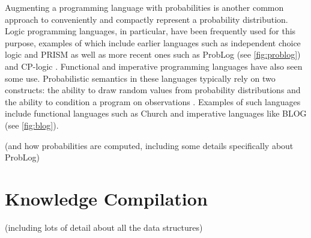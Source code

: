 Augmenting a programming language with probabilities is another common approach
to conveniently and compactly represent a probability distribution. Logic
programming languages, in particular, have been frequently used for this
purpose, examples of which include earlier languages such as independent choice
logic \citep{DBLP:journals/ai/Poole97} and PRISM \citep{DBLP:conf/ijcai/SatoK97}
as well as more recent ones such as ProbLog \citep{DBLP:conf/ijcai/RaedtKT07}
(see \cref{fig:problog}) and CP-logic \citep{DBLP:journals/tplp/VennekensDB09}.
Functional and imperative programming languages have also seen some use.
Probabilistic semantics in these languages typically rely on two constructs: the
ability to draw random values from probability distributions and the ability to
condition a program on observations \citep{DBLP:conf/icse/GordonHNR14}. Examples
of such languages include functional languages such as Church
\citep{DBLP:conf/uai/GoodmanMRBT08} and imperative languages like BLOG
\citep{DBLP:conf/ijcai/MilchMRSOK05} (see \cref{fig:blog}).

(and how probabilities are computed, including some details specifically about ProbLog)

\section{Knowledge Compilation} \label{sec:kc}

(including lots of detail about all the data structures)

